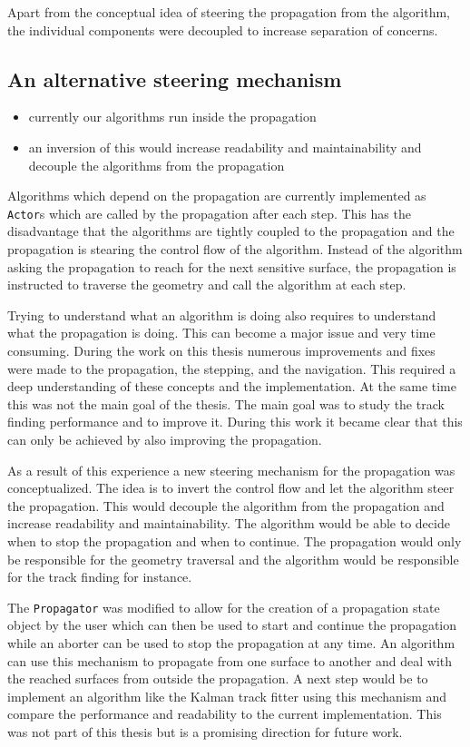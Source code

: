 Apart from the conceptual idea of steering the propagation from the algorithm, the individual components were decoupled to increase separation of concerns.

\subsection{An alternative steering mechanism}

\begin{itemize}
    \color{red}
    \item currently our algorithms run inside the propagation
    \item an inversion of this would increase readability and maintainability and decouple the algorithms from the propagation
\end{itemize}

Algorithms which depend on the propagation are currently implemented as \texttt{Actor}s which are called by the propagation after each step. This has the disadvantage that the algorithms are tightly coupled to the propagation and the propagation is stearing the control flow of the algorithm. Instead of the algorithm asking the propagation to reach for the next sensitive surface, the propagation is instructed to traverse the geometry and call the algorithm at each step.

Trying to understand what an algorithm is doing also requires to understand what the propagation is doing. This can become a major issue and very time consuming. During the work on this thesis numerous improvements and fixes were made to the propagation, the stepping, and the navigation. This required a deep understanding of these concepts and the implementation. At the same time this was not the main goal of the thesis. The main goal was to study the track finding performance and to improve it. During this work it became clear that this can only be achieved by also improving the propagation.

As a result of this experience a new steering mechanism for the propagation was conceptualized. The idea is to invert the control flow and let the algorithm steer the propagation. This would decouple the algorithm from the propagation and increase readability and maintainability. The algorithm would be able to decide when to stop the propagation and when to continue. The propagation would only be responsible for the geometry traversal and the algorithm would be responsible for the track finding for instance.

The \texttt{Propagator} was modified to allow for the creation of a propagation state object by the user which can then be used to start and continue the propagation while an aborter can be used to stop the propagation at any time. An algorithm can use this mechanism to propagate from one surface to another and deal with the reached surfaces from outside the propagation. A next step would be to implement an algorithm like the Kalman track fitter using this mechanism and compare the performance and readability to the current implementation. This was not part of this thesis but is a promising direction for future work.

